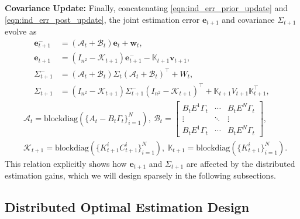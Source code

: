 \documentclass[letterpaper, 10 pt, conference]{ieeeconf}  %
\begin{document}
\textbf{Covariance Update:} Finally, concatenating \eqref{eqn:ind_err_prior_update} and \eqref{eqn:ind_err_post_update}, the joint estimation error $\textbf{e}_{t+1}$ and covariance $\Sigma_{t+1}$ evolve as
\begin{subequations}
    \begin{align}
        \textbf{e}_{t+1}^-&=(\mathcal{A}_t+\mathcal{B}_t)\textbf{e}_t+\textbf{w}_t,\\
        \textbf{e}_{t+1}&=(I_{n^2}-\mathcal{K}_{t+1})\textbf{e}_{t+1}^--\mathbb{K}_{t+1}\textbf{v}_{t+1},\\
        \Sigma_{t+1}^-&=(\mathcal{A}_t+\mathcal{B}_t)\Sigma_t(\mathcal{A}_t+\mathcal{B}_t)^\top+W_t\label{eqn:prior_cov_update},\\
        \Sigma_{t+1}&=(I_{n^2}-\mathcal{K}_{t+1})\Sigma_{t+1}^-(I_{n^2}-\mathcal{K}_{t+1})^\top+\mathbb{K}_{t+1}V_{t+1}\mathbb{K}_{t+1}^\top,\label{eqn:post_cov_update}
    \end{align}
\end{subequations}
\begin{equation*}
    \begin{aligned}
        &\mathcal{A}_t=\text{blockdiag}(\{A_t-B_t\Gamma_t\}_{i=1}^N),\ 
        \mathcal{B}_t=\begin{bmatrix}
                B_tE^1\Gamma_t & \cdots & B_tE^N\Gamma_t\\
                \vdots & \ddots & \vdots \\
                B_tE^1\Gamma_t & \cdots & B_tE^N\Gamma_t
            \end{bmatrix},\\
        &\mathcal{K}_{t+1}=\text{blockdiag}(\{K_{t+1}^iC_{t+1}^i\}_{i=1}^N),\
        \mathbb{K}_{t+1}=\text{blockdiag}(\{K_{t+1}^i\}_{i=1}^N).
    \end{aligned}
    \label{eqn:augmented_system_matrices}
\end{equation*}
This relation explicitly shows how $\textbf{e}_{t+1}$ and $\Sigma_{t+1}$ are affected by the distributed estimation gains, which we will design sparsely in the following subsections.



\subsection{Distributed Optimal Estimation Design}
\label{sec:distributed_est_gain}
\end{document}
